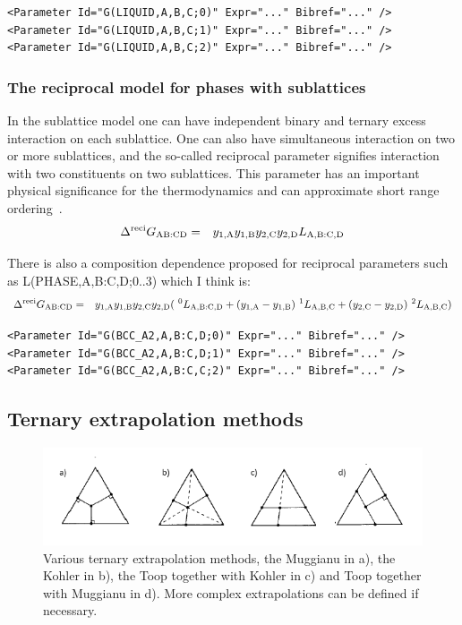 \documentclass{article}
\begin{document}
\begin{appendices}
\begin{verbatim}
<Parameter Id="G(LIQUID,A,B,C;0)" Expr="..." Bibref="..." />
<Parameter Id="G(LIQUID,A,B,C;1)" Expr="..." Bibref="..." />
<Parameter Id="G(LIQUID,A,B,C;2)" Expr="..." Bibref="..." />
\end{verbatim}

\subsubsection{The reciprocal model for phases with sublattices}\label{sec:recip}

In the sublattice model one can have independent binary and ternary
excess interaction on each sublattice.  One can also have simultaneous
interaction on two or more sublattices, and the so-called reciprocal
parameter signifies interaction with two constituents on two
sublattices.  This parameter has an important physical significance
for the thermodynamics and can approximate short range
ordering~\cite{98Sun}.
\begin{eqnarray}
\Delta ^{\rm reci}G_{\rm AB:CD} &=& y_{1,\rm A} y_{1,\rm B} y_{2,\rm C} y_{2,\rm D} L_{\rm A,B:C,D}
\end{eqnarray}

There is also a composition dependence proposed for reciprocal
parameters such as L(PHASE,A,B:C,D;0..3) which I think is:
\begin{eqnarray}
\Delta  ^{\rm reci}G_{\rm AB:CD} &=& y_{1,\rm A}y_{1,\rm B}y_{2,\rm C}y_{2,\rm D} (~^0L_{\rm A,B:C,D} +  (y_{1,\rm A}-y_{1,\rm B})~^1L_{\rm A,B,C} + (y_{2,\rm C}-y_{2,\rm D})~^2L_{\rm A,B,C})  \label{eq:hillert4}
\end{eqnarray}

\begin{verbatim}
<Parameter Id="G(BCC_A2,A,B:C,D;0)" Expr="..." Bibref="..." />
<Parameter Id="G(BCC_A2,A,B:C,D;1)" Expr="..." Bibref="..." />
<Parameter Id="G(BCC_A2,A,B:C,C;2)" Expr="..." Bibref="..." />
\end{verbatim}

\subsection{Ternary extrapolation methods}\label{sec:ternaryxpol}

\begin{figure}[!h]
  \includegraphics[width=\textwidth]{figs/MKT2.png}
  \caption{Various ternary extrapolation methods, the Muggianu in a),
    the Kohler in b), the Toop together with Kohler in c) and Toop
    together with Muggianu in d).  More complex extrapolations can be
    defined if necessary.}\label{fg:MKT2}
\end{figure}


\end{appendices}
\end{document}
